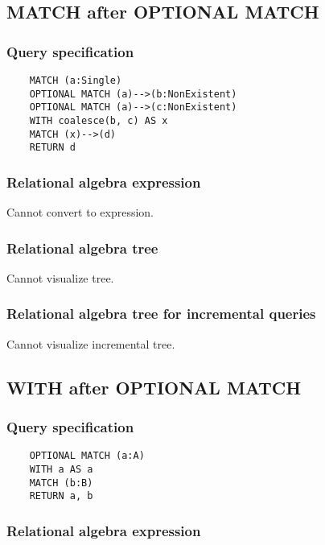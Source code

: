 	\subsection{MATCH after OPTIONAL MATCH}

	\subsubsection*{Query specification}

	\begin{lstlisting}
	MATCH (a:Single)
	OPTIONAL MATCH (a)-->(b:NonExistent)
	OPTIONAL MATCH (a)-->(c:NonExistent)
	WITH coalesce(b, c) AS x
	MATCH (x)-->(d)
	RETURN d
	\end{lstlisting}


	\subsubsection*{Relational algebra expression}

	Cannot convert to expression.

	\subsubsection*{Relational algebra tree}

	Cannot visualize tree.

	\subsubsection*{Relational algebra tree for incremental queries}

	Cannot visualize incremental tree.
	\subsection{WITH after OPTIONAL MATCH}

	\subsubsection*{Query specification}

	\begin{lstlisting}
	OPTIONAL MATCH (a:A)
	WITH a AS a
	MATCH (b:B)
	RETURN a, b
	\end{lstlisting}


	\subsubsection*{Relational algebra expression}

